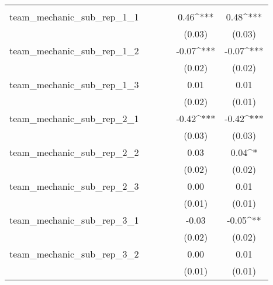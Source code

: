 \begin{table}
\begin{center}
\begin{tabular}{l@{} S[table-format=5.5]@{} S[table-format=5.7]@{} S[table-format=5.5]@{} S[table-format=5.7]@{} S[table-format=5.7]@{}}
                                     &             &              &             &               &              \\
\quad team\_mechanic\_sub\_rep\_1\_1 &             &              &             & 0.46^{***}    & 0.48^{***}   \\
                                     &             &              &             & (0.03)        & (0.03)       \\
\quad team\_mechanic\_sub\_rep\_1\_2 &             &              &             & -0.07^{***}   & -0.07^{***}  \\
                                     &             &              &             & (0.02)        & (0.02)       \\
\quad team\_mechanic\_sub\_rep\_1\_3 &             &              &             & 0.01          & 0.01         \\
                                     &             &              &             & (0.02)        & (0.01)       \\
\quad team\_mechanic\_sub\_rep\_2\_1 &             &              &             & -0.42^{***}   & -0.42^{***}  \\
                                     &             &              &             & (0.03)        & (0.03)       \\
\quad team\_mechanic\_sub\_rep\_2\_2 &             &              &             & 0.03          & 0.04^{*}     \\
                                     &             &              &             & (0.02)        & (0.02)       \\
\quad team\_mechanic\_sub\_rep\_2\_3 &             &              &             & 0.00          & 0.01         \\
                                     &             &              &             & (0.01)        & (0.01)       \\
\quad team\_mechanic\_sub\_rep\_3\_1 &             &              &             & -0.03         & -0.05^{**}   \\
                                     &             &              &             & (0.02)        & (0.02)       \\
\quad team\_mechanic\_sub\_rep\_3\_2 &             &              &             & 0.00          & 0.01         \\
                                     &             &              &             & (0.01)        & (0.01)       \\

\end{tabular}
\end{center}
\end{table}
